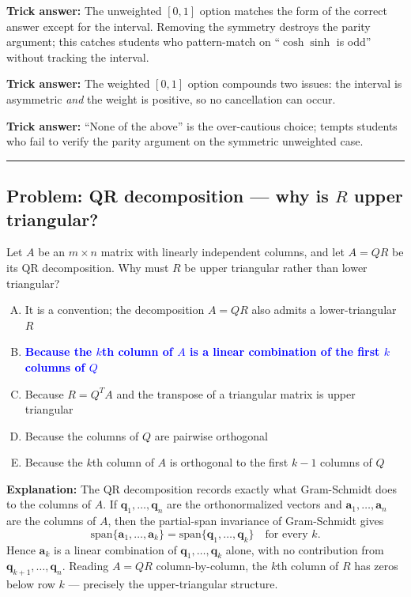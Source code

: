 \documentclass[12pt]{amsart}
\newcommand{\divider}{
  \vspace{-1em}
  \noindent
  \raisebox{-0.15ex}{\textbullet}%
  \hspace{0.5em}%
  \rule[0.5ex]{0.95\textwidth}{1.0pt}%
  \hspace{0.5em}%
  \raisebox{-0.15ex}{\textbullet}%
  \vspace{0em}
}
\begin{document}
\textbf{Trick answer:}
The unweighted $[0,1]$ option matches the form of the correct answer except
for the interval. Removing the symmetry destroys the parity argument; this
catches students who pattern-match on ``$\cosh \sinh$ is odd'' without
tracking the interval.

\textbf{Trick answer:}
The weighted $[0,1]$ option compounds two issues: the interval is asymmetric
\emph{and} the weight is positive, so no cancellation can occur.

\textbf{Trick answer:}
``None of the above'' is the over-cautious choice; tempts students who fail
to verify the parity argument on the symmetric unweighted case.

\divider

\subsection*{Problem: QR decomposition --- why is $R$ upper triangular?}

Let $A$ be an $m \times n$ matrix with linearly independent columns, and let
$A = QR$ be its QR decomposition. Why must $R$ be upper triangular rather
than lower triangular?

\begin{enumerate}[(A)]
\item It is a convention; the decomposition $A = QR$ also admits a lower-triangular $R$
\item \textcolor{blue}{\textbf{Because the $k$th column of $A$ is a linear combination of the first $k$ columns of $Q$}}
\item Because $R = Q^T A$ and the transpose of a triangular matrix is upper triangular
\item Because the columns of $Q$ are pairwise orthogonal
\item Because the $k$th column of $A$ is orthogonal to the first $k-1$ columns of $Q$
\end{enumerate}

\textbf{Explanation:}
The QR decomposition records exactly what Gram-Schmidt does to the columns
of $A$. If $\mathbf{q}_1, \ldots, \mathbf{q}_n$ are the orthonormalized
vectors and $\mathbf{a}_1, \ldots, \mathbf{a}_n$ are the columns of $A$,
then the partial-span invariance of Gram-Schmidt gives
$$\mathrm{span}\{\mathbf{a}_1, \ldots, \mathbf{a}_k\} = \mathrm{span}\{\mathbf{q}_1, \ldots, \mathbf{q}_k\} \quad \text{for every } k.$$
Hence $\mathbf{a}_k$ is a linear combination of $\mathbf{q}_1, \ldots, \mathbf{q}_k$
alone, with no contribution from $\mathbf{q}_{k+1}, \ldots, \mathbf{q}_n$.
Reading $A = QR$ column-by-column, the $k$th column of $R$ has zeros below
row $k$ --- precisely the upper-triangular structure.
\end{document}
